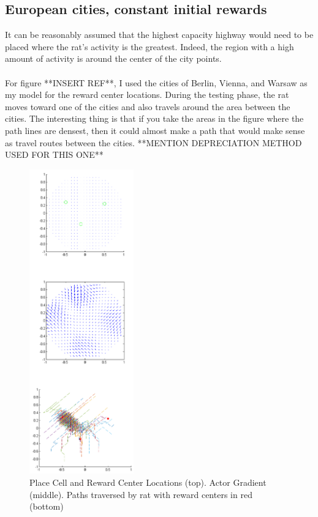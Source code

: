 \documentclass[conference]{IEEEtran}
\begin{document}
\subsection{European cities, constant initial rewards}

It can be reasonably assumed that the highest capacity highway would need to be placed where the rat's activity is the greatest. Indeed, the region with a high amount of activity is around the center of the city points. \\
\\
For figure **INSERT REF**, I used the cities of Berlin, Vienna, and Warsaw as my model for the reward center locations. During the testing phase, the rat moves toward one of the cities and also travels around the area between the cities. The interesting thing is that if you take the areas in the figure where the path lines are densest, then it could almost make a path that would make sense as travel routes between the cities. 
**MENTION DEPRECIATION METHOD USED FOR THIS ONE**

\begin{figure}
\includegraphics[width=0.4\textwidth]{waterMazeRevised2_Figure.png} 
\caption{Place Cell and Reward Center Locations (top). Actor Gradient (middle). Paths traversed by rat with reward centers in red (bottom)}
\end{figure}
\end{document}
